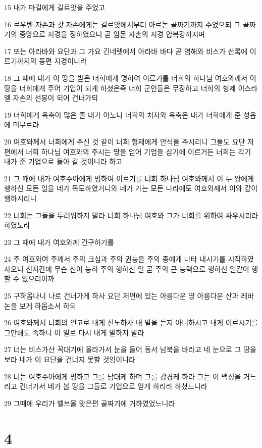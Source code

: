 \par 15 내가 마길에게 길르앗을 주었고
\par 16 르우벤 자손과 갓 자손에게는 길르앗에서부터 아르논 골짜기까지 주었으되 그 골짜기의 중앙으로 지경을 정하였으니 곧 암몬 자손의 지경 얍복강까지며
\par 17 또는 아라바와 요단과 그 가요 긴네렛에서 아라바 바다 곧 염해와 비스가 산록에 이르기까지의 동편 지경이니라
\par 18 그 때에 내가 이 땅을 받은 너희에게 명하여 이르기를 너희의 하나님 여호와께서 이 땅을 너희에게 주어 기업이 되게 하셨은즉 너희 군인들은 무장하고 너희의 형제 이스라엘 자손의 선봉이 되어 건너가되
\par 19 너희에게 육축이 많은 줄 내가 아노니 너희의 처자와 육축은 내가 너희에게 준 성읍에 머무르라
\par 20 여호와께서 너희에게 주신 것 같이 너희 형제에게 안식을 주시리니 그들도 요단 저편에서 너희 하나님 여호와의 주시는 땅을 얻어 기업을 삼기에 이르거든 너희는 각기 내가 준 기업으로 돌아 갈 것이니라 하고
\par 21 그 때에 내가 여호수아에게 명하여 이르기를 너희 하나님 여호와께서 이 두 왕에게 행하신 모든 일을 네가 목도하였거니와 네가 가는 모든 나라에도 여호와께서 이와 같이 행하시리니
\par 22 너희는 그들을 두려워하지 말라 너희 하나님 여호와 그가 너희를 위하여 싸우시리라 하였노라
\par 23 그 때에 내가 여호와께 간구하기를
\par 24 주 여호와여 주께서 주의 크심과 주의 권능을 주의 종에게 나타 내시기를 시작하였사오니 천지간에 무슨 신이 능히 주의 행하신 일 곧 주의 큰 능력으로 행하신 일같이 행할 수 있으리이까
\par 25 구하옵나니 나로 건너가게 하사 요단 저편에 있는 아름다운 땅 아름다운 산과 레바논을 보게 하옵소서 하되
\par 26 여호와께서 너희의 연고로 내게 진노하사 내 말을 듣지 아니하시고 내게 이르시기를 그만해도 족하니 이 일로 다시 내게 말하지 말라
\par 27 너는 비스가산 꼭대기에 올라가서 눈을 들어 동서 남북을 바라고 네 눈으로 그 땅을 보라 네가 이 요단을 건너지 못할 것임이니라
\par 28 너는 여호수아에게 명하고 그를 담대케 하며 그를 강경케 하라 그는 이 백성을 거느리고 건너가서 네가 볼 땅을 그들로 기업으로 얻게 하리라 하셨느니라
\par 29 그때에 우리가 벨브올 맞은편 골짜기에 거하였었느니라

\chapter{4}

